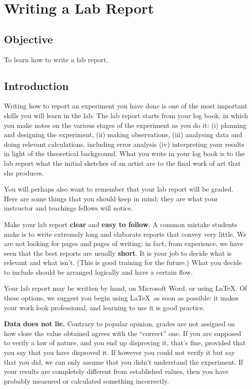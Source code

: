 \chapter{Writing a Lab Report}

\section{Objective}

To learn how to write a lab report. 

\section{Introduction}

Writing how to report an experiment you have done is one of the most important skills you will learn in the lab. The lab report starts from your log book, in which you make notes on the various stages of the experiment as you do it: (i) planning and designing the experiment, (ii) making observations, (iii) analysing data and doing relevant calculations, including error analysis (iv) interpreting your results in light of the theoretical background. What you write in your log book is to the lab report what the initial sketches of an artist are to the final work of art that she produces.

You will perhaps also want to remember that your lab report will be graded. Here are some things that you should keep in mind; they are what your instructor and teachings fellows will notice.

Make your lab report \textbf{clear} and \textbf{easy to follow}. A common mistake students make is to write extremely long and elaborate reports that convey very little. We are not looking for pages and pages of writing; in fact, from experience, we have seen that the best reports are usually \textbf{short}. It is your job to decide what is relevant and what isn't. (This is good training for the future.) What you decide to include should be arranged logically and have a certain flow. 

\begin{imp}
Your lab report may be written by hand, on Microsoft Word, or using \LaTeX. Of these options, we suggest you begin using \LaTeX\, as soon as possible: it makes your work look professional, and learning to use it is good practice.
\end{imp}

\textbf{Data does not lie.} Contrary to popular opinion, grades are not assigned on how close the value obtained agrees with the ``correct'' one. If you are supposed to verify a law of nature, and you end up disproving it, that's fine, provided that you say that you have disproved it. If however you could not verify it but say that you did, we can only assume that you didn't understand the experiment. If your results are completely different from established values, then you have probably measured or calculated something incorrectly. 

